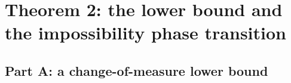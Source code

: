 %
%

\section{Theorem 2: the lower bound and the impossibility phase transition}
\label{sec:theorem2}

\subsection{Part A: a change-of-measure lower bound}
\label{sec:theorem2-parta}

